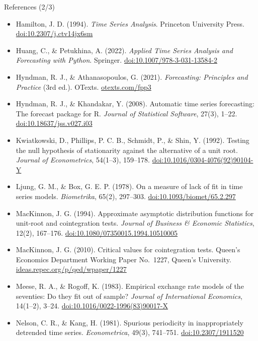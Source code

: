 \begin{frame}{References (2/3)}
\itemsize{\scriptsize}
\begin{itemize}
    \item Hamilton, J. D. (1994). \textit{Time Series Analysis}. Princeton University Press. \href{https://doi.org/10.2307/j.ctv14jx6sm}{doi:10.2307/j.ctv14jx6sm}
    \item Huang, C., \& Petukhina, A. (2022). \textit{Applied Time Series Analysis and Forecasting with Python}. Springer. \href{https://doi.org/10.1007/978-3-031-13584-2}{doi:10.1007/978-3-031-13584-2}
    \item Hyndman, R. J., \& Athanasopoulos, G. (2021). \textit{Forecasting: Principles and Practice} (3rd ed.). OTexts. \href{https://otexts.com/fpp3/}{otexts.com/fpp3}
    \item Hyndman, R. J., \& Khandakar, Y. (2008). Automatic time series forecasting: The forecast package for R. \textit{Journal of Statistical Software}, 27(3), 1--22. \href{https://doi.org/10.18637/jss.v027.i03}{doi:10.18637/jss.v027.i03}
    \item Kwiatkowski, D., Phillips, P. C. B., Schmidt, P., \& Shin, Y. (1992). Testing the null hypothesis of stationarity against the alternative of a unit root. \textit{Journal of Econometrics}, 54(1--3), 159--178. \href{https://doi.org/10.1016/0304-4076(92)90104-Y}{doi:10.1016/0304-4076(92)90104-Y}
    \item Ljung, G. M., \& Box, G. E. P. (1978). On a measure of lack of fit in time series models. \textit{Biometrika}, 65(2), 297--303. \href{https://doi.org/10.1093/biomet/65.2.297}{doi:10.1093/biomet/65.2.297}
    \item MacKinnon, J. G. (1994). Approximate asymptotic distribution functions for unit-root and cointegration tests. \textit{Journal of Business \& Economic Statistics}, 12(2), 167--176. \href{https://doi.org/10.1080/07350015.1994.10510005}{doi:10.1080/07350015.1994.10510005}
    \item MacKinnon, J. G. (2010). Critical values for cointegration tests. Queen's Economics Department Working Paper No.~1227, Queen's University. \href{https://ideas.repec.org/p/qed/wpaper/1227.html}{ideas.repec.org/p/qed/wpaper/1227}
    \item Meese, R. A., \& Rogoff, K. (1983). Empirical exchange rate models of the seventies: Do they fit out of sample? \textit{Journal of International Economics}, 14(1--2), 3--24. \href{https://doi.org/10.1016/0022-1996(83)90017-X}{doi:10.1016/0022-1996(83)90017-X}
    \item Nelson, C. R., \& Kang, H. (1981). Spurious periodicity in inappropriately detrended time series. \textit{Econometrica}, 49(3), 741--751. \href{https://doi.org/10.2307/1911520}{doi:10.2307/1911520}
\end{itemize}
\end{frame}

